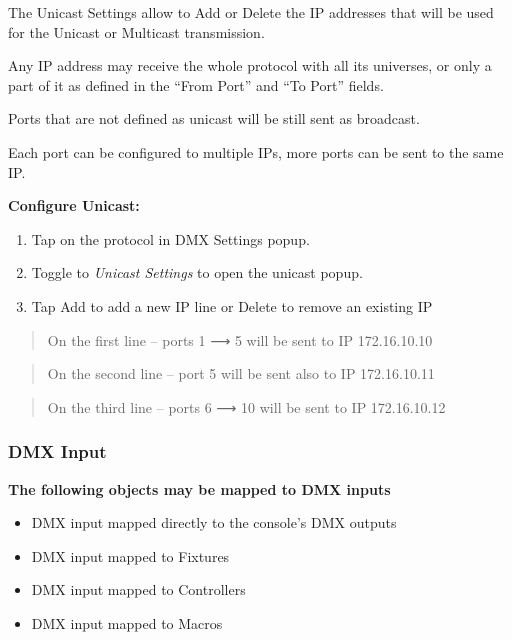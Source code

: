 \documentclass[
]{article}
\begin{document}
The Unicast Settings allow to Add or Delete the IP addresses that will be used for the Unicast or Multicast transmission.

Any IP address may receive the whole protocol with all its universes, or only a part of it as defined in the ``From Port'' and ``To Port'' fields.

Ports that are not defined as unicast will be still sent as broadcast.

Each port can be configured to multiple IPs, more ports can be sent to the same IP.

\textbf{Configure Unicast:}

\begin{enumerate}
\def\labelenumi{\arabic{enumi}.}
\item
  Tap on the protocol in DMX Settings popup.
\item
  Toggle to \emph{Unicast Settings} to open the unicast popup.
\item
  Tap Add to add a new IP line or Delete to remove an existing IP
\end{enumerate}

\begin{quote}
On the first line -- ports 1 ⟶ 5 will be sent to IP 172.16.10.10
\end{quote}

\begin{quote}
On the second line -- port 5 will be sent also to IP 172.16.10.11
\end{quote}

\begin{quote}
On the third line -- ports 6 ⟶ 10 will be sent to IP 172.16.10.12
\end{quote}

\hypertarget{dmx-input}{%
\subsubsection{DMX Input}\label{dmx-input}}

\textbf{The following objects may be mapped to DMX inputs}

\begin{itemize}
\item
  DMX input mapped directly to the console's DMX outputs
\item
  DMX input mapped to Fixtures
\item
  DMX input mapped to Controllers
\item
  DMX input mapped to Macros
\end{itemize}
\end{document}

